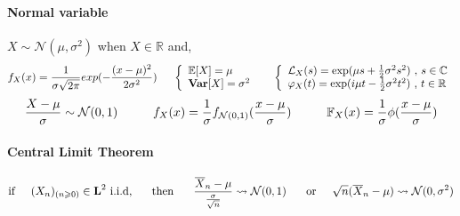 \documentclass[a4paper,10pt]{article}
\begin{document}
\paragraph{Normal variable} $X \sim \mathcal{N}(\mu,\sigma^2)$ when $X \in \mathbb{R}$ and,
\[
f_{X}(x) = \frac{1}{\sigma \sqrt{2\pi}} exp (-\frac{(x-\mu)^2}{2\sigma^2})
\hspace{5mm}
\left\{
\begin{array}{l}
\mathbb{E}[X]=\mu \\
\textbf{Var}[X]=\sigma^2
\end{array}\right.
\hspace{5mm}
\left\{
\begin{array}{l}
\mathcal{L}_{X}(s) =  \text{exp}(\mu s  + \frac{1}{2} \sigma^2 s^2) \hbox{ , } s\in\mathbb{C} \\
\varphi_{X}(t)     =  \text{exp}(i\mu t - \frac{1}{2} \sigma^2 t^2) \hbox{ , } t\in\mathbb{R}
\end{array}\right.
\]
\[
\frac{X - \mu}{\sigma} \sim \mathcal{N}(0,1)
\hspace{10mm}
f_{X}(x) = \frac{1}{\sigma}f_{\mathcal{N}(0,1)}(\frac{x-\mu}{\sigma})
\hspace{10mm}
\mathbb{F}_{X}(x) = \frac{1}{\sigma}\phi(\frac{x-\mu}{\sigma})
\]
\paragraph{Central Limit Theorem}
\[
\text{if} \hspace{5mm} (X_{n})_{(n\geqslant 0)} \in \textbf{L}^2 \text{  i.i.d,} \hspace{5mm} \text{ then  } \hspace{5mm}
\frac{\overline{X}_n - \mu}{\frac{\sigma}{\sqrt{n}}} \rightsquigarrow   \mathcal{N}(0,1)
 \hspace{5mm}  \text{    or} \hspace{5mm}  
\sqrt{n}(\overline{X}_n - \mu) \rightsquigarrow   \mathcal{N}(0,\sigma^{2})
\]
\end{document}
